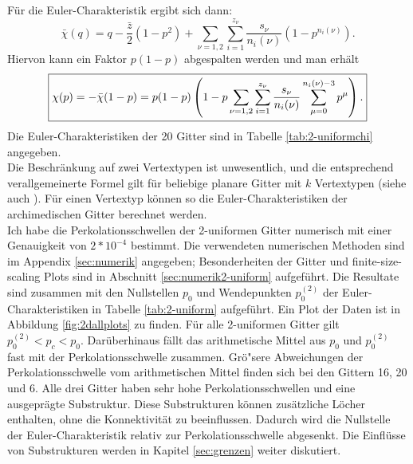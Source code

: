 F\"ur die Euler-Charakteristik ergibt sich dann:
\begin{equation}
  \bar{\chi}(q)=q-\frac{\bar{z}}{2}(1-p^2)+\sum_{\nu=1,2}\sum_{i=1}^{z_\nu}\frac{s_\nu}{n_{i}(\nu)}(1-p^{n_{i}(\nu)}).
\end{equation}
Hiervon kann ein Faktor $p(1-p)$ abgespalten werden und man erh\"alt
\begin{equation}
  \label{eq:2-uniform}
 \fbox{$\displaystyle \chi(p)=-\bar{\chi}(1-p)=p(1-p)\left( 1-p\sum_{\nu=1,2}\sum_{i=1}^{z_\nu}\frac{s_\nu}{n_{i}(\nu)}\sum_{\mu=0}^{n_{i}(\nu)-3}p^\mu \right). $}
\end{equation}
Die Euler-Charakteristiken der 20 Gitter sind in Tabelle \ref{tab:2-uniformchi} angegeben.
\\Die Beschr\"ankung auf zwei Vertextypen ist unwesentlich, und die entsprechend verallgemeinerte Formel gilt f\"ur beliebige planare Gitter mit $k$ Vertextypen (siehe auch \cite{Wagner:02}). F\"ur einen Vertextyp k\"onnen so die Euler-Charakteristiken der archimedischen Gitter berechnet werden.
\\Ich habe die Perkolationsschwellen der 2-uniformen Gitter numerisch mit einer Genauigkeit von $2*10^{-4}$ bestimmt. Die verwendeten numerischen Methoden sind im Appendix \ref{sec:numerik} angegeben; Besonderheiten der Gitter und finite-size-scaling Plots sind in Abschnitt \ref{sec:numerik2-uniform} aufgef\"uhrt. Die Resultate sind zusammen mit den Nullstellen $p_0$ und Wendepunkten $p_0^{(2)}$ der Euler-Charakteristiken in Tabelle \ref{tab:2-uniform} aufgef\"uhrt. Ein Plot der Daten ist in Abbildung \ref{fig:2dallplots} zu finden.  F\"ur alle 2-uniformen Gitter gilt $p_0^{(2)}<p_c<p_0$. Dar\"uberhinaus f\"allt das arithmetische Mittel aus  $p_0$ und $p^{(2)}_0$ fast mit der Perkolationsschwelle zusammen. Gr\"o"sere Abweichungen der Perkolationsschwelle vom arithmetischen Mittel finden sich bei den Gittern 16, 20 und 6. Alle drei Gitter haben sehr hohe Perkolationsschwellen und eine ausgepr\"agte Substruktur. Diese Substrukturen k\"onnen zus\"atzliche L\"ocher enthalten, ohne die Konnektivit\"at zu beeinflussen. Dadurch wird die Nullstelle der Euler-Charakteristik relativ zur Perkolationsschwelle abgesenkt. Die Einfl\"usse von Substrukturen werden in Kapitel \ref{sec:grenzen} weiter diskutiert. 

